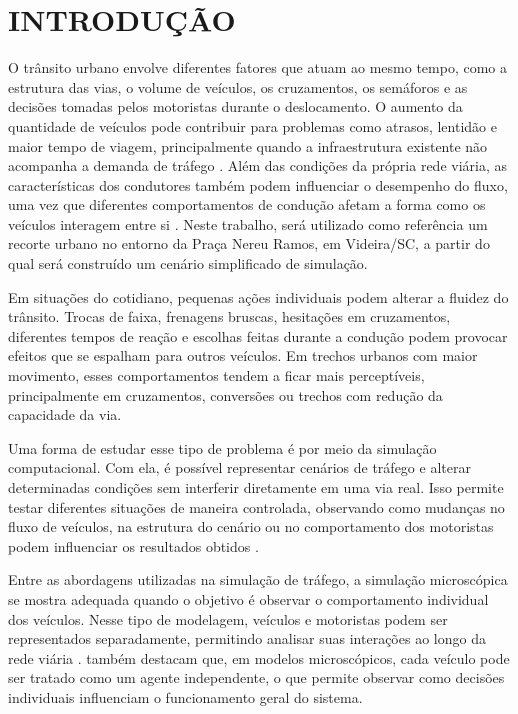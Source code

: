 \chapter{INTRODUÇÃO}

O trânsito urbano envolve diferentes fatores que atuam ao mesmo tempo, como a estrutura das vias, o volume de veículos, os cruzamentos, os semáforos e as decisões tomadas pelos motoristas durante o deslocamento. O aumento da quantidade de veículos pode contribuir para problemas como atrasos, lentidão e maior tempo de viagem, principalmente quando a infraestrutura existente não acompanha a demanda de tráfego \cite{dorokhin_2020}. Além das condições da própria rede viária, as características dos condutores também podem influenciar o desempenho do fluxo, uma vez que diferentes comportamentos de condução afetam a forma como os veículos interagem entre si \cite{zhai_2021}. Neste trabalho, será utilizado como referência um recorte urbano no entorno da Praça Nereu Ramos, em Videira/SC, a partir do qual será construído um cenário simplificado de simulação.

Em situações do cotidiano, pequenas ações individuais podem alterar a fluidez do trânsito. Trocas de faixa, frenagens bruscas, hesitações em cruzamentos, diferentes tempos de reação e escolhas feitas durante a condução podem provocar efeitos que se espalham para outros veículos. Em trechos urbanos com maior movimento, esses comportamentos tendem a ficar mais perceptíveis, principalmente em cruzamentos, conversões ou trechos com redução da capacidade da via.

Uma forma de estudar esse tipo de problema é por meio da simulação computacional. Com ela, é possível representar cenários de tráfego e alterar determinadas condições sem interferir diretamente em uma via real. Isso permite testar diferentes situações de maneira controlada, observando como mudanças no fluxo de veículos, na estrutura do cenário ou no comportamento dos motoristas podem influenciar os resultados obtidos \cite{dorokhin_2020}.

Entre as abordagens utilizadas na simulação de tráfego, a simulação microscópica se mostra adequada quando o objetivo é observar o comportamento individual dos veículos. Nesse tipo de modelagem, veículos e motoristas podem ser representados separadamente, permitindo analisar suas interações ao longo da rede viária \cite{brambila_2008}.  também destacam que, em modelos microscópicos, cada veículo pode ser tratado como um agente independente, o que permite observar como decisões individuais influenciam o funcionamento geral do sistema.

